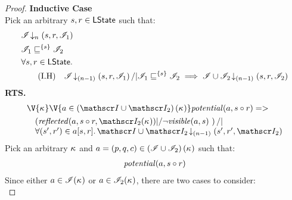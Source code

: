 \begin{lemma}
\begin{proof}
\noindent\textbf{Inductive Case}\\
Pick an arbitrary $s, r \in \textsf{LState}$ such that:
\begin{align}
	&\extendsAMUpto{\lmod}{n}{s}{r}{\lmod_1} \label{LSC:Ass1}\\
	&\lmod_1 \weakenI{\{s\}} \lmod_2 \label{LSC:Ass2}\\
%		
	&	\for{s, r \in \LStates}  \nonumber\\
	& \tag{I.H} 
		\quad \extendsAMUpto{\lmod}{(n-1)}{s}{r}{\lmod_1} /| \lmod_1 \weakenI{\{s\}} \lmod_2 \implies \extendsAMUpto{\lmod \cup \lmod_2}{(n-1)}{s}{r}{\lmod_2} \label{LSC:IH}
\end{align}
%
\textbf{RTS. } 
%
\begin{align}
  &\V{\ca{}}\V{a\in \left(\lmod \cup \lmod_2 \right) (\ca{})}
  \m{potential}(a,s \composeL r) =>\null \nonumber \\
  & \quad
  \begin{array}{@{} l @{}}
		\left(\m{reflected}(a,s \composeL r, \lmod_2(\ca{})) |/ \neg\m{visible}(a,s) \ \right) /| \\
		\for{(s', r') \in a[s, r]} \extendsAMUpto{\lmod \cup \lmod_2}{(n-1)}{s'}{r'}{\lmod_2}
 	\end{array} \label{LSC:Goal3}
\end{align}
%
Pick an arbitrary $\kappa_{}$ and $a = (p, q, c) \in \left(\mathscr{I} \cup \mathscr{I}_2 \right)(\kappa_{})$ such that:
%
\begin{align}
	\mathit{potential}(a, s \circ r)\label{LSC:Ass8}
\end{align}
%
Since either $a \in \mathscr{I}(\kappa_{})$ or $a \in \mathscr{I}_2(\kappa_{})$, there are two cases to consider:\\


\end{proof}
\end{lemma}
